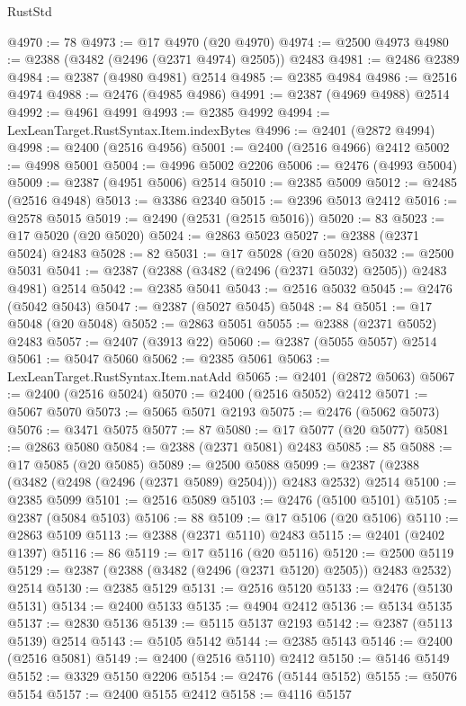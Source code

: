\begin{lexlean}{RustStd}
\begin{coremodule}
{\begin{coremodule}
{{{{{{{{{{{{{{{{{{{{{{{{{{{{{{{{{{{{{{{{{{{{{{{{{{@4970 := 78
@4973 := @17 @4970 (@20 @4970)
@4974 := @2500 @4973
@4980 := @2388 (@3482 (@2496 (@2371 @4974) @2505)) @2483
@4981 := @2486 @2389
@4984 := @2387 (@4980 @4981) @2514
@4985 := @2385 @4984
@4986 := @2516 @4974
@4988 := @2476 (@4985 @4986)
@4991 := @2387 (@4969 @4988) @2514
@4992 := @4961 @4991
@4993 := @2385 @4992
@4994 := LexLeanTarget.RustSyntax.Item.indexBytes
@4996 := @2401 (@2872 @4994)
@4998 := @2400 (@2516 @4956)
@5001 := @2400 (@2516 @4966) @2412
@5002 := @4998 @5001
@5004 := @4996 @5002 @2206
@5006 := @2476 (@4993 @5004)
@5009 := @2387 (@4951 @5006) @2514
@5010 := @2385 @5009
@5012 := @2485 (@2516 @4948)
@5013 := @3386 @2340
@5015 := @2396 @5013 @2412
@5016 := @2578 @5015
@5019 := @2490 (@2531 (@2515 @5016))
@5020 := 83
@5023 := @17 @5020 (@20 @5020)
@5024 := @2863 @5023
@5027 := @2388 (@2371 @5024) @2483
@5028 := 82
@5031 := @17 @5028 (@20 @5028)
@5032 := @2500 @5031
@5041 := @2387 (@2388 (@3482 (@2496 (@2371 @5032) @2505)) @2483 @4981) @2514
@5042 := @2385 @5041
@5043 := @2516 @5032
@5045 := @2476 (@5042 @5043)
@5047 := @2387 (@5027 @5045)
@5048 := 84
@5051 := @17 @5048 (@20 @5048)
@5052 := @2863 @5051
@5055 := @2388 (@2371 @5052) @2483
@5057 := @2407 (@3913 @22)
@5060 := @2387 (@5055 @5057) @2514
@5061 := @5047 @5060
@5062 := @2385 @5061
@5063 := LexLeanTarget.RustSyntax.Item.natAdd
@5065 := @2401 (@2872 @5063)
@5067 := @2400 (@2516 @5024)
@5070 := @2400 (@2516 @5052) @2412
@5071 := @5067 @5070
@5073 := @5065 @5071 @2193
@5075 := @2476 (@5062 @5073)
@5076 := @3471 @5075
@5077 := 87
@5080 := @17 @5077 (@20 @5077)
@5081 := @2863 @5080
@5084 := @2388 (@2371 @5081) @2483
@5085 := 85
@5088 := @17 @5085 (@20 @5085)
@5089 := @2500 @5088
@5099 := @2387 (@2388 (@3482 (@2498 (@2496 (@2371 @5089) @2504))) @2483 @2532) @2514
@5100 := @2385 @5099
@5101 := @2516 @5089
@5103 := @2476 (@5100 @5101)
@5105 := @2387 (@5084 @5103)
@5106 := 88
@5109 := @17 @5106 (@20 @5106)
@5110 := @2863 @5109
@5113 := @2388 (@2371 @5110) @2483
@5115 := @2401 (@2402 @1397)
@5116 := 86
@5119 := @17 @5116 (@20 @5116)
@5120 := @2500 @5119
@5129 := @2387 (@2388 (@3482 (@2496 (@2371 @5120) @2505)) @2483 @2532) @2514
@5130 := @2385 @5129
@5131 := @2516 @5120
@5133 := @2476 (@5130 @5131)
@5134 := @2400 @5133
@5135 := @4904 @2412
@5136 := @5134 @5135
@5137 := @2830 @5136
@5139 := @5115 @5137 @2193
@5142 := @2387 (@5113 @5139) @2514
@5143 := @5105 @5142
@5144 := @2385 @5143
@5146 := @2400 (@2516 @5081)
@5149 := @2400 (@2516 @5110) @2412
@5150 := @5146 @5149
@5152 := @3329 @5150 @2206
@5154 := @2476 (@5144 @5152)
@5155 := @5076 @5154
@5157 := @2400 @5155 @2412
@5158 := @4116 @5157
}}}}}}}}}}}}}}}}}}}}}}}}}}}}}}}}}}}}}}}}}}}}}}}}}}
\end{coremodule}}
\end{coremodule}
\end{lexlean}
